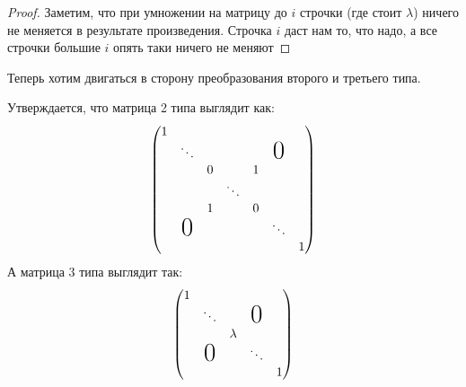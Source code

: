 \begin{proof}
    Заметим, что при умножении на матрицу до $i$ строчки
    (где стоит $\lambda$) ничего не меняется в результате произведения.
    Строчка $i$ даст нам то, что надо, а все строчки большие $i$ опять таки
    ничего не меняют
\end{proof}
\begin{motivation}
    Теперь хотим двигаться в сторону преобразования второго и
    третьего типа.
\end{motivation}
Утверждается, что матрица 2 типа выглядит как:
\[
\begin{pmatrix}
    1& & & & & & \\
     &\ddots& & & &\text{\huge 0} &\\
     & &0& &1& & \\
     & & &\ddots& & &\\
     & &1& &0& & \\
     & \text{\huge 0}& & & &\ddots& \\
    & & & & & &1\\
\end{pmatrix}
\]
А матрица 3 типа выглядит так:
\[
\begin{pmatrix}
    1 & & & &\\
      &\ddots& &\text{\huge 0} & \\
      & &\lambda& & \\
      & \text{\huge 0} & &\ddots& \\
      & & & &1\\
\end{pmatrix}
\]
